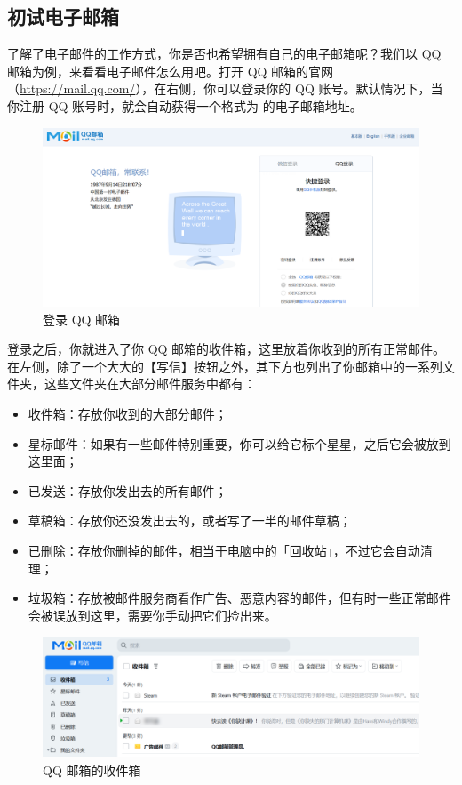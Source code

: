 \subsection{初试电子邮箱}

了解了电子邮件的工作方式，你是否也希望拥有自己的电子邮箱呢？我们以 QQ 邮箱为例，来看看电子邮件怎么用吧。打开 QQ 邮箱的官网（\url{https://mail.qq.com/}），在右侧，你可以登录你的 QQ 账号。默认情况下，当你注册 QQ 账号时，就会自动获得一个格式为  的电子邮箱地址。

\begin{figure}[htb!]
  \centering
  \includegraphics[width=.7\textwidth]{assets/software/QQ_Mail_Login.png}
  \caption{登录 QQ 邮箱}
  \label{fig:QQ_Mail_Login}
\end{figure}

登录之后，你就进入了你 QQ 邮箱的收件箱，这里放着你收到的所有正常邮件。在左侧，除了一个大大的【写信】按钮之外，其下方也列出了你邮箱中的一系列文件夹，这些文件夹在大部分邮件服务中都有：

\begin{itemize}
  \item 收件箱：存放你收到的大部分邮件；
  \item 星标邮件：如果有一些邮件特别重要，你可以给它标个星星，之后它会被放到这里面；
  \item 已发送：存放你发出去的所有邮件；
  \item 草稿箱：存放你还没发出去的，或者写了一半的邮件草稿；
  \item 已删除：存放你删掉的邮件，相当于电脑中的「回收站」，不过它会自动清理；
  \item 垃圾箱：存放被邮件服务商看作广告、恶意内容的邮件，但有时一些正常邮件会被误放到这里，需要你手动把它们捡出来。
\end{itemize}

\begin{figure}[htb!]
  \centering
  \includegraphics[width=.8\textwidth]{assets/software/QQ_Mail_Inbox.png}
  \caption{QQ 邮箱的收件箱}
  \label{fig:QQ_Mail_Inbox}
\end{figure}

